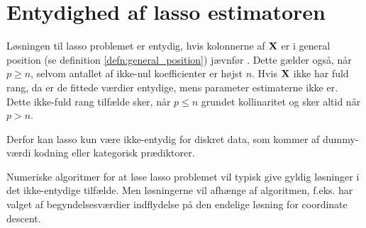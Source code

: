 \section{Entydighed af lasso estimatoren}
Løsningen til lasso problemet er entydig, hvis kolonnerne af \(\mathbf{X}\) er i general position (se definition \ref{defn:general_position}) jævnfør \citep{lasso_unique}.
Dette gælder også, når \(p \geq n\), selvom antallet af ikke-nul koefficienter er højst \(n\).
Hvis \(\mathbf{X}\) ikke har fuld rang, da er de fittede værdier entydige, mens parameter estimaterne ikke er.
Dette ikke-fuld rang tilfælde sker, når \(p \leq n\) grundet kollinaritet og sker altid når \(p>n\).
 


Derfor kan lasso kun være ikke-entydig for diskret data, som kommer af dummy-værdi kodning eller kategorisk prædiktorer.

Numeriske algoritmer for at løse lasso problemet vil typisk give gyldig løsninger i det ikke-entydige tilfælde.
Men løsningerne vil afhænge af algoritmen, f.eks. har valget af begyndelsesværdier indflydelse på den endelige løsning for coordinate descent.

%


